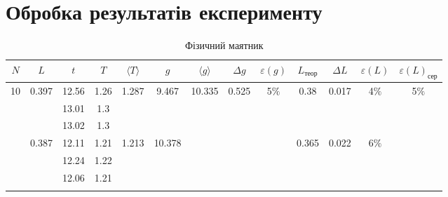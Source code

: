 \documentclass[a4paper,12pt]{article}
\begin{document}
\section{Обробка результатів експерименту}
\begin{table}[htp]\centering
\caption{Фізичний маятник}
\begin{tabular}{|c|c|c|c|c|c|c|c|c|c|c|c|c|}
\hline
$N$                 & $L$                    & $t$   & $T$  & $\langle T\rangle$     & $g$                   & $\langle g\rangle$    & $\Delta g$           & $\varepsilon(g)$       & $L_{\textrm{теор}}$    & $\Delta L$             & $\varepsilon(L)$       & $\varepsilon(L)_{\textrm{сер}}$ \\ \hline
\multirow{9}{*}{10} & \multirow{3}{*}{0.397} & 12.56 & 1.26 & \multirow{3}{*}{1.287} & \multirow{3}{*}{9.467}  & \multirow{9}{*}{10.335} & \multirow{9}{*}{0.525} & \multirow{9}{*}{5$\%$} & \multirow{3}{*}{0.38}  & \multirow{3}{*}{0.017} & \multirow{3}{*}{4$\%$} & \multirow{9}{*}{5$\%$}          \\ \cline{3-4}
                    &                        & 13.01 & 1.3  &                        &                       &                       &                      &                        &                        &                        &                        &                                 \\ \cline{3-4}
                    &                        & 13.02 & 1.3  &                        &                       &                       &                      &                        &                        &                        &                        &                                 \\ \cline{2-6} \cline{10-12}
                    & \multirow{3}{*}{0.387} & 12.11 & 1.21 & \multirow{3}{*}{1.213} & \multirow{3}{*}{10.378} &                       &                      &                        & \multirow{3}{*}{0.365} & \multirow{3}{*}{0.022} & \multirow{3}{*}{6$\%$} &                                 \\ \cline{3-4}
                    &                        & 12.24 & 1.22 &                        &                       &                       &                      &                        &                        &                        &                        &                                 \\ \cline{3-4}
                    &                        & 12.06 & 1.21 &                        &                       &                       &                      &                        &                        &                        &                        &                                 \\ \cline{2-6} \cline{10-12}

\end{tabular}
\end{table}
\end{document}
